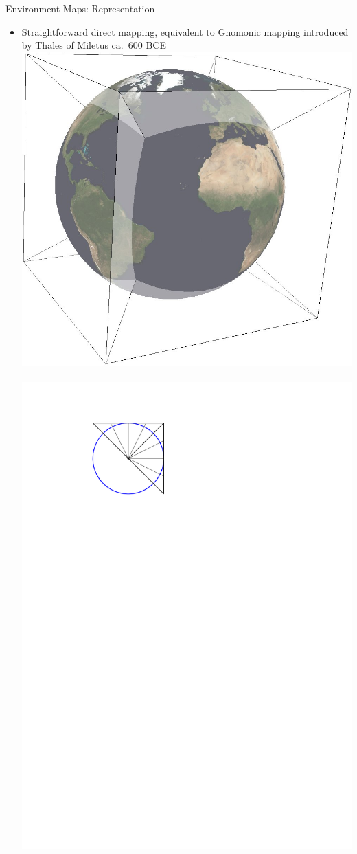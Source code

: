 \documentclass[utf8,stillsansserifmath,fleqn,t]{beamer}
\begin{document}
\begin{frame}
\frametitle{\insertsection}
Environment Maps: Representation
\begin{itemize}
\item Straightforward direct mapping, equivalent to Gnomonic
mapping introduced by Thales of Miletus ca.~600 BCE\\
\includegraphics[height=.33\textheight]{./fig/sphere-in-cube.jpg}~~
\includegraphics[height=.33\textheight]{./fig/gnomonic-projection.pdf}~~

\end{itemize}
\end{frame}
\end{document}
